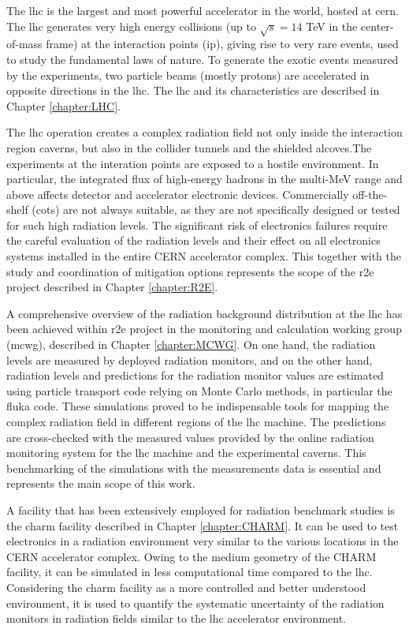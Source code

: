 \documentclass[encoding=utf8,british]{tumphthesis}
\begin{document}
The \acrshort{lhc} is the largest and most powerful accelerator in the world, hosted at \acrshort{cern}. The \acrshort{lhc} generates very high energy collisions (up to $\sqrt{s} = 14$ TeV in the center-of-mass frame) at the interaction points (\acrshort{ip}), giving rise to very rare events, used to study the fundamental laws of nature. To generate the exotic events measured by the experiments, two particle beams (mostly protons) are accelerated in opposite directions in the \acrshort{lhc}. The \acrshort{lhc} and its characteristics are described in Chapter \ref{chapter:LHC}.

The \acrshort{lhc} operation creates a complex radiation field not only inside the interaction region caverns, but also in the collider tunnels and the shielded alcoves.The experiments at the interation points are exposed to a hostile environment. In particular, the integrated flux of high-energy hadrons in the multi-MeV range and above affects detector and accelerator electronic devices. Commercially off-the-shelf (\acrshort{cots}) are not always suitable, as they are not specifically designed or tested for such high radiation levels. The significant risk of electronics failures require the careful evaluation of the radiation levels and their effect on all electronics systems installed in the entire CERN accelerator complex. This together with the study and coordination of mitigation options represents the scope of the \acrfull{r2e} project described in Chapter \ref{chapter:R2E}.

A comprehensive overview of the radiation background distribution at the \acrshort{lhc} has been achieved within \acrshort{r2e} project in the monitoring and calculation working group (\acrshort{mcwg}), described in Chapter \ref{chapter:MCWG}. On one hand, the radiation levels are measured by deployed radiation monitors, and on the other hand, radiation levels and predictions for the radiation monitor values are estimated using particle transport code relying on Monte Carlo methods, in particular the \acrshort{fluka} code. These simulations proved to be indispensable tools for mapping the complex radiation field in different regions of the \acrshort{lhc} machine. The predictions are cross-checked with the measured values provided by the online radiation monitoring system for the \acrshort{lhc} machine and the experimental caverns. This benchmarking of the simulations with the measurements data is essential and represents the main scope of this work.

A facility that has been extensively employed for radiation benchmark studies is the \acrfull{charm} facility described in Chapter \ref{chapter:CHARM}. It can be used to test electronics in a radiation environment very similar to the various locations in the CERN accelerator complex. Owing to the medium geometry of the CHARM facility, it can be simulated in less computational time compared to the \acrshort{lhc}. Considering the \acrshort{charm} facility as a more controlled and better understood environment, it is used to quantify the systematic uncertainty of the radiation monitors in radiation fields similar to the \acrshort{lhc} accelerator environment. 
\end{document}
